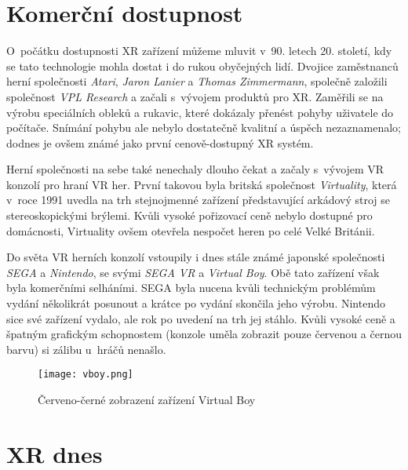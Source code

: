 \section{Komerční dostupnost}

O~počátku dostupnosti XR zařízení můžeme mluvit v~90. letech 20. století, kdy se tato technologie mohla dostat i do rukou obyčejných lidí. Dvojice zaměstnanců herní společnosti \textit{Atari}, \textit{Jaron Lanier} a \textit{Thomas Zimmermann}, společně založili společnost \textit{VPL Research} a začali s~vývojem produktů pro XR. Zaměřili se na výrobu speciálních obleků a rukavic, které dokázaly přenést pohyby uživatele do počítače. Snímání pohybu ale nebylo dostatečně kvalitní a úspěch nezaznamenalo; dodnes je ovšem známé jako první cenově-dostupný XR systém. \cite{otechnice_2}

Herní společnosti na sebe také nenechaly dlouho čekat a začaly s~vývojem VR konzolí pro hraní VR her. První takovou byla britská společnost \textit{Virtuality}, která v~roce 1991 uvedla na trh stejnojmenné zařízení představující arkádový stroj se stereoskopickými brýlemi. Kvůli vysoké pořizovací ceně nebylo dostupné pro domácnosti, Virtuality ovšem otevřela nespočet heren po celé Velké Británii. \cite{otechnice_2} \cite{independent_virtuality}

Do světa VR herních konzolí vstoupily i dnes stále známé japonské společnosti \textit{SEGA} a \textit{Nintendo}, se svými \textit{SEGA VR} a \textit{Virtual Boy}. Obě tato zařízení však byla komerčními selháními. SEGA byla nucena kvůli technickým problémům vydání několikrát posunout a krátce po vydání skončila jeho výrobu. Nintendo sice své zařízení vydalo, ale rok po uvedení na trh jej stáhlo. Kvůli vysoké ceně a špatným grafickým schopnostem (konzole uměla zobrazit pouze červenou a černou barvu) si zálibu u~hráčů nenašlo.\cite{otechnice_2}

\begin{figure}[H]
    \centering
    \texttt{[image: vboy.png]}
    \caption{Červeno-černé zobrazení zařízení Virtual Boy \cite{vboy}}
    \label{vboy_red_display}
\end{figure}

\section{XR dnes}

